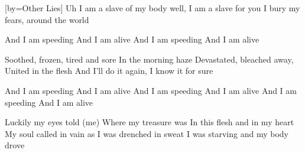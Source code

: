[by={Other Lies}]
  \chordsoff
  \beginverse
  Uh I am a slave of my body well,
  I am a slave for you
  I bury my fears, around the world
  \endverse

  \beginchorus
  And I am speeding And I am alive
  And I am speeding And I am alive
  \endchorus

  \beginverse
  Soothed, frozen, tired and sore
  In the morning haze
  Devastated, bleached away,
  United in the flesh  
  And I’ll do it again,
  I know it for sure
  \endverse
  
  \beginchorus
  And I am speeding And I am alive
  And I am speeding And I am alive
  And I am speeding And I am alive
  \endchorus
  
  \beginverse
  Luckily my eyes told (me)
  Where my treasure was
  In this flesh and in my heart
  My soul called in vain
  as I was drenched in sweat
  I was starving and my body drove
  \endverse

  
\endsong
